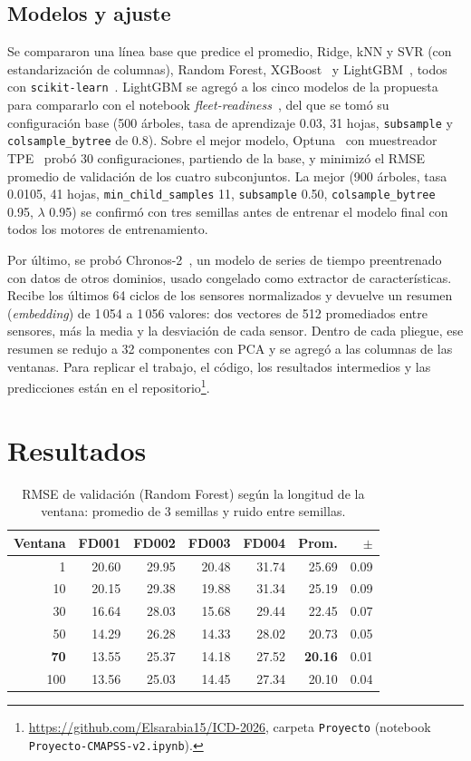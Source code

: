 \documentclass[conference]{IEEEtran}
\begin{document}
\subsection{Modelos y ajuste}
Se compararon una línea base que predice el promedio, Ridge, kNN y SVR (con estandarización de columnas), Random Forest, XGBoost~\cite{xgboost} y LightGBM~\cite{lightgbm}, todos con \texttt{scikit-learn}~\cite{sklearn}. LightGBM se agregó a los cinco modelos de la propuesta para compararlo con el notebook \emph{fleet-readiness}~\cite{fleet}, del que se tomó su configuración base (500 árboles, tasa de aprendizaje 0.03, 31 hojas, \texttt{subsample} y \texttt{colsample\_bytree} de 0.8). Sobre el mejor modelo, Optuna~\cite{optuna} con muestreador TPE~\cite{tpe} probó 30 configuraciones, partiendo de la base, y minimizó el RMSE promedio de validación de los cuatro subconjuntos. La mejor (900 árboles, tasa 0.0105, 41 hojas, \texttt{min\_child\_samples} 11, \texttt{subsample} 0.50, \texttt{colsample\_bytree} 0.95, $\lambda$ 0.95) se confirmó con tres semillas antes de entrenar el modelo final con todos los motores de entrenamiento.

Por último, se probó Chronos-2~\cite{chronos2}, un modelo de series de tiempo preentrenado con datos de otros dominios, usado congelado como extractor de características. Recibe los últimos 64 ciclos de los sensores normalizados y devuelve un resumen (\emph{embedding}) de 1\,054 a 1\,056 valores: dos vectores de 512 promediados entre sensores, más la media y la desviación de cada sensor. Dentro de cada pliegue, ese resumen se redujo a 32 componentes con PCA y se agregó a las columnas de las ventanas. Para replicar el trabajo, el código, los resultados intermedios y las predicciones están en el repositorio\footnote{\url{https://github.com/Elsarabia15/ICD-2026}, carpeta \texttt{Proyecto} (notebook \texttt{Proyecto-CMAPSS-v2.ipynb}).}.

\section{Resultados}

\begin{table}[t]
\centering
\caption{RMSE de validación (Random Forest) según la longitud de la ventana: promedio de 3 semillas y ruido entre semillas.}
\label{tab:ventanas}
\footnotesize
\setlength{\tabcolsep}{4pt}
\begin{tabular}{@{}rrrrrrr@{}}
\toprule
Ventana & FD001 & FD002 & FD003 & FD004 & Prom. & $\pm$ \\
\midrule
1   & 20.60 & 29.95 & 20.48 & 31.74 & 25.69 & 0.09 \\
10  & 20.15 & 29.38 & 19.88 & 31.34 & 25.19 & 0.09 \\
30  & 16.64 & 28.03 & 15.68 & 29.44 & 22.45 & 0.07 \\
50  & 14.29 & 26.28 & 14.33 & 28.02 & 20.73 & 0.05 \\
\textbf{70} & 13.55 & 25.37 & 14.18 & 27.52 & \textbf{20.16} & 0.01 \\
100 & 13.56 & 25.03 & 14.45 & 27.34 & 20.10 & 0.04 \\
\bottomrule
\end{tabular}
\end{table}
\end{document}
